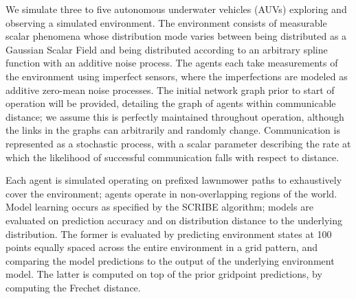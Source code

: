 We simulate three to five autonomous underwater vehicles (AUVs) exploring and observing a simulated environment. The environment consists of measurable scalar phenomena whose distribution mode varies between being distributed as a Gaussian Scalar Field and being distributed according to an arbitrary spline function with an additive noise process. The agents each take measurements of the environment using imperfect sensors, where the imperfections are modeled as additive zero-mean noise processes. The initial network graph prior to start of operation will be provided, detailing the graph of agents within communicable distance; we assume this is perfectly maintained throughout operation, although the links in the graphs can arbitrarily and randomly change. Communication is represented as a stochastic process, with a scalar parameter describing the rate at which the likelihood of successful communication falls with respect to distance.


Each agent is simulated operating on prefixed lawnmower paths to exhaustively cover the environment; agents operate in non-overlapping regions of the world. Model learning occurs as specified by the SCRIBE algorithm; models are evaluated on prediction accuracy and on distribution distance to the underlying distribution. The former is evaluated by predicting environment states at 100 points equally spaced across the entire environment in a grid pattern, and comparing the model predictions to the output of the underlying environment model. The latter is computed on top of the prior gridpoint predictions, by computing the Frechet distance.


